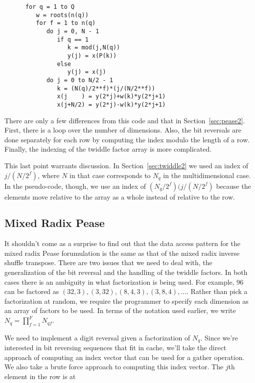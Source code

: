 \documentclass{article}
\begin{document}
\begin{verbatim}
      for q = 1 to Q
         w = roots(n(q))
         for f = 1 to n(q)
            do j = 0, N - 1
               if q == 1
                  k = mod(j,N(q))
                  y(j) = x(P(k))
               else
                  y(j) = x(j)
            do j = 0 to N/2 - 1
               k = (N(q)/2**f)*(j/(N/2**f))
               x(j    ) = y(2*j)+w(k)*y(2*j+1)
               x(j+N/2) = y(2*j)-w(k)*y(2*j+1)
\end{verbatim}
%
There are only a few differences from this code and that in
Section~\ref{sec:pease2}.  First, there is a loop over the number of
dimensions.  Also, the bit reversals are done separately for each row
by computing the index modulo the length of a row.  Finally, the
indexing of the twiddle factor array is more complicated.

This last point warrants discussion.  In Section~\ref{sec:twiddle2} we
used an index of $j/(N/2^f)$, where $N$ in that case corresponds to
$N_q$ in the multidimensional case.  In the pseudo-code, though, we
use an index of $(N_q/2^f)(j/(N/2^f)$ because the elements move
relative to the array as a whole instead of relative to the row.

\subsection{Mixed Radix Pease} \label{sec:pease}

It shouldn't come as a surprise to find out that the data access
pattern for the mixed radix Pease forumulation is the same as that of
the mixed radix inverse shuffle transpose.  There are two issues that
we need to deal with, the generalization of the bit reversal and the
handling of the twiddle factors.  In both cases there is an ambiguity
in what factorization is being used.  For example, 96 can be factored
as $(32,3), (3,32), (8, 4, 3), (3, 8, 4), \ldots$.  Rather than pick a
factorization at random, we require the programmer to specify each
dimension as an array of factors to be used.  In terms of the notation
used earlier, we write $N_q = \prod_{f=1}^F N_{qf}$.

We need to implement a digit reversal given a factorization of $N_q$.
Since we're interested in bit reversing sequences that fit in cache,
we'll take the direct approach of computing an index vector that can
be used for a gather operation.  We also take a brute force approach
to computing this index vector.  The $j$th element in the row is at
\end{document}
